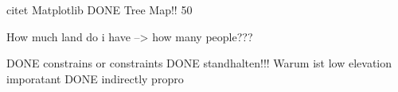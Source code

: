 citet Matplotlib
DONE Tree Map!!
50%

How much land do i have --> how many people???

DONE constrains or constraints
DONE standhalten!!!
Warum ist low elevation imporatant
DONE indirectly propro
